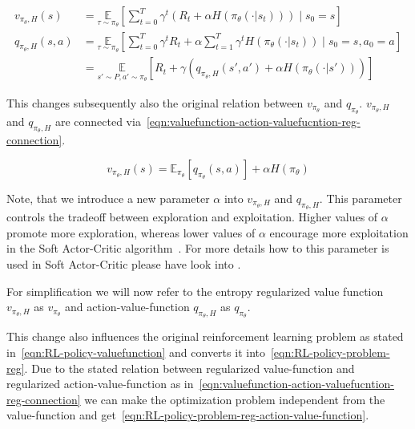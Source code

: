 \begin{align}
	v_{\pi_\theta, H}(s) &= \underset{\tau\sim\pi_\theta}{\mathbb{E}}\left[\sum_{t=0}^T\gamma^t\left(R_t + \alpha H(\pi_\theta(\cdot|s_t))\right)\mid s_0 = s\right]\label{eqn:valuefunction-entropy-reg} \\
	q_{\pi_\theta, H}(s, a) &= \underset{\tau\sim\pi_\theta}{\mathbb{E}}\left[\sum_{t=0}^T\gamma^t R_t + \alpha \sum_{t=1}^T \gamma^t H(\pi_\theta(\cdot|s_t))\mid s_0 = s, a_0=a\right]\label{eqn:action-valuefunction-entropy-reg} \\
	&= \underset{s'\sim P, a' \sim \pi_\theta}{\mathbb{E}}\left[R_t + \gamma (q_{\pi_\theta, H}(s', a') + \alpha H(\pi_\theta(\cdot|s')))\right]\label{eqn:action-valuefunction-entropy-reg-recursive} 
\end{align} 

This changes subsequently also the original relation between $v_{\pi_\theta}$ and $q_{\pi_\theta}$. $v_{\pi_\theta, H}$ and $q_{\pi_\theta, H}$ are connected via~\eqref{eqn:valuefunction-action-valuefucntion-reg-connection}.

\begin{equation}\label{eqn:valuefunction-action-valuefucntion-reg-connection}
	v_{\pi_\theta, H}(s) = \mathbb{E}_{\pi_\theta}\left[q_{\pi_\theta}(s, a)\right] + \alpha H(\pi_\theta)
\end{equation}

Note, that we introduce a new parameter $\alpha$ into $v_{\pi_\theta,H}$ and $q_{\pi_\theta,H}$. This parameter controls the tradeoff between exploration and exploitation.  Higher values of $\alpha$ promote more exploration, whereas lower values of $\alpha$ encourage more exploitation in the Soft Actor-Critic algorithm~\cite{SpinningUp2018}. For more details how to this parameter is used in Soft Actor-Critic please have look into .

For simplification we will now refer to the entropy regularized value function $v_{\pi_\theta,H}$ as $v_{\pi_\theta}$ and action-value-function $q_{\pi_\theta,H}$ as $q_{\pi_\theta}$. 

This change also influences the original reinforcement learning problem as stated in~\eqref{eqn:RL-policy-valuefunction} and converts it into~\eqref{eqn:RL-policy-problem-reg}. Due to the stated relation between regularized value-function and regularized action-value-function as in~\eqref{eqn:valuefunction-action-valuefucntion-reg-connection} we can make the optimization problem independent from the value-function and get~\eqref{eqn:RL-policy-problem-reg-action-value-function}.

